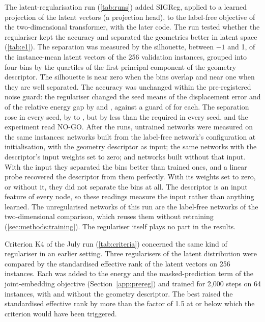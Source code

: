 The latent-regularisation run (\cref{tab:runs}) added SIGReg, applied to a learned
projection of the latent vectors (a projection head), to the label-free objective of the two-dimensional transformer, with the later code. The run tested whether the regulariser
kept the accuracy and
separated the geometries better in latent space (\cref{tab:e1}). The separation was measured
by the silhouette, between $-1$ and 1, of the instance-mean latent vectors of the 256
validation instances, grouped into four bins by the quartiles of the first principal component of the geometry descriptor. The silhouette is near zero when the bins overlap and
near one when they are well
separated. The accuracy was unchanged within the pre-registered noise guard: the
regulariser changed the seed means of the displacement error and of the relative energy gap
by \numEOneAccDisp{} and \numEOneAccGap{}, against a guard of \numEOneAccGuard{} for each.
The separation rose in every seed, by \numEOneDeltaMin{} to \numEOneDeltaMax{}, but by less
than the \numEOneFloor{} required in every seed, and the experiment read NO-GO. After the
runs, untrained networks were measured on the same instances: networks built from the
label-free network's configuration at initialisation, with the geometry descriptor as input;
the same networks with the descriptor's input weights set to zero; and networks built
without that input. With the input they separated the bins better than trained ones, and a
linear probe recovered the descriptor from them perfectly. With its weights set to zero, or
without it, they did not separate the bins at all.
The descriptor is an input feature of every node, so these readings measure the input
rather than anything learned. The unregularised networks of this run are the label-free
networks of the two-dimensional comparison, which reuses them without retraining (\cref{sec:methods:training}). The regulariser itself plays no part in the results.

Criterion K4 of the July run (\cref{tab:criteria}) concerned the same kind of regulariser in an earlier setting. Three regularisers of the latent
distribution were compared by the standardised effective rank of the latent vectors on 256
instances. Each was added to the energy and the masked-prediction term of the
joint-embedding objective (Section~\ref{app:prereg}) and trained for 2,000 steps on 64
instances, with and without the geometry descriptor. The best
raised the standardised effective rank by more than the factor of 1.5 at or below which the criterion would have been
triggered.

